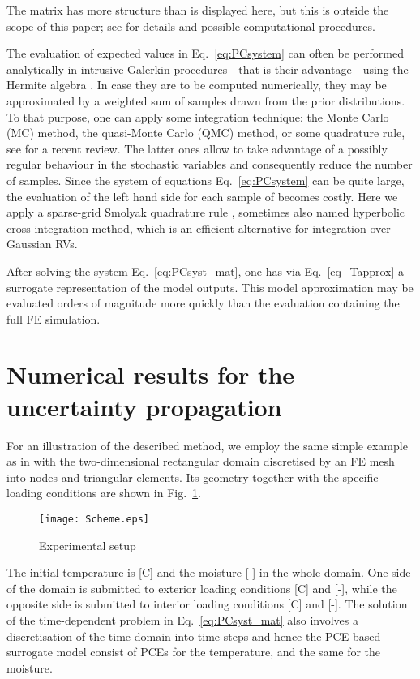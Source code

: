 \documentclass[preprint,12pt]{elsarticle}
\begin{document}
The matrix  has more structure than is displayed here,
but this is outside the scope of this paper;
see \cite{Matthies:2005:CMAME, Matthies:2007:IB} for details and
possible computational procedures.

The evaluation of expected values in Eq.~\eqref{eq:PCsystem} can often
be performed analytically in intrusive Galerkin procedures---that is
their advantage---using the Hermite algebra \cite{Matthies:2007:IB}.
In case they are to be computed numerically, they may be
approximated by a weighted sum of samples drawn from the
prior distributions. To that purpose, one can apply some
integration technique: the Monte Carlo (MC) method, the quasi-Monte Carlo
(QMC) method, or some quadrature rule, see \cite{Matthies:2007:IB} for
a recent review. The latter ones allow to take advantage of a possibly
regular behaviour
in the stochastic variables and consequently reduce the number of
samples. Since the system of equations Eq.~\eqref{eq:PCsystem} can be
quite large, the evaluation of the left hand side for each sample of
 becomes costly. Here we apply a sparse-grid Smolyak quadrature
rule \cite{Smolyak:1963, Keese:2003:TR, Matthies:2005:CMAME,
  Matthies:2007:IB}, sometimes also named hyperbolic cross integration
method, which is an efficient alternative for integration over Gaussian RVs.

After solving the system Eq.~\eqref{eq:PCsyst_mat}, one has via
Eq.~\eqref{eq_Tapprox} a surrogate representation of the model
outputs. This model approximation may be evaluated orders of magnitude
more quickly than the evaluation containing the full FE simulation.

\section{Numerical results for the uncertainty propagation}
\label{sec:res_prop}
For an illustration of the described method, we employ the same simple
example as in \cite{Kucerova:2011:AMC} with the two-dimensional
rectangular domain discretised by an FE mesh into  nodes and
 triangular elements. Its geometry together with the specific
loading conditions are shown in Fig.~\ref{fig_scheme}.
\begin{figure}[h!]
\centering
\texttt{[image: Scheme.eps]}
\caption{Experimental setup} \label{fig_scheme}
\end{figure}
The initial temperature is 
[C] and the moisture  [-]
in the whole domain. One side of the domain is submitted to
exterior loading conditions 
[C] and  [-], while the
opposite side is submitted to interior loading conditions
 [C] and
 [-]. The solution of the
time-dependent problem in Eq.~\eqref{eq:PCsyst_mat} also involves
a discretisation of the time domain  into  time
steps and hence the PCE-based surrogate model consist of  PCEs for the temperature, and the same for the
moisture.
\end{document}
